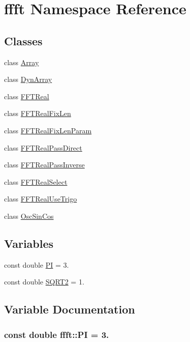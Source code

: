 \hypertarget{a00142}{\section{ffft Namespace Reference}
\label{a00142}
}
\subsection*{Classes}
\begin{DoxyCompactItemize}
\item 
class \hyperlink{a00003}{Array}
\item 
class \hyperlink{a00007}{Dyn\+Array}
\item 
class \hyperlink{a00010}{F\+F\+T\+Real}
\item 
class \hyperlink{a00011}{F\+F\+T\+Real\+Fix\+Len}
\item 
class \hyperlink{a00012}{F\+F\+T\+Real\+Fix\+Len\+Param}
\item 
class \hyperlink{a00013}{F\+F\+T\+Real\+Pass\+Direct}
\item 
class \hyperlink{a00014}{F\+F\+T\+Real\+Pass\+Inverse}
\item 
class \hyperlink{a00015}{F\+F\+T\+Real\+Select}
\item 
class \hyperlink{a00016}{F\+F\+T\+Real\+Use\+Trigo}
\item 
class \hyperlink{a00020}{Osc\+Sin\+Cos}
\end{DoxyCompactItemize}
\subsection*{Variables}
\begin{DoxyCompactItemize}
\item 
const double \hyperlink{a00142_a74ffcd4c90202b5240bbca7374dfd6fa}{P\+I} = 3.
\item 
const double \hyperlink{a00142_a489004390ad7d791bf53a724c0f07abb}{S\+Q\+R\+T2} = 1.
\end{DoxyCompactItemize}


\subsection{Variable Documentation}
\hypertarget{a00142_a74ffcd4c90202b5240bbca7374dfd6fa}{
\subsubsection[{P\+I}]{\setlength{\rightskip}{0pt plus 5cm}const double ffft\+::\+P\+I = 3.}}\label{a00142_a74ffcd4c90202b5240bbca7374dfd6fa}



